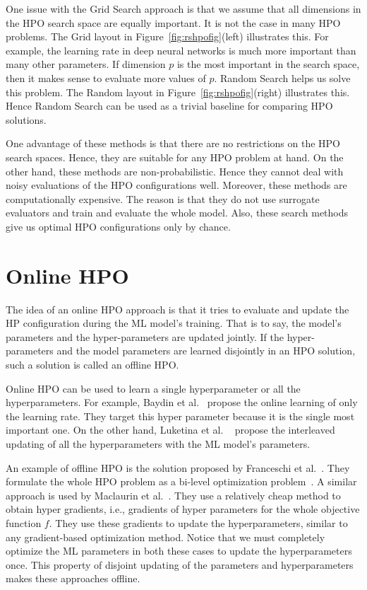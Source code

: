\documentclass[12pt, twoside, ngerman]{report}
\begin{document}
One issue with the Grid Search approach is that we assume that all dimensions in the HPO search space are equally important. It is not the case in many HPO problems. The Grid layout in Figure~\ref{fig:rshpofig}(left) illustrates this. For example, the learning rate in deep neural networks is much more important than many other parameters. If dimension $p$ is the most important in the search space, then it makes sense to evaluate more values of $p$. Random Search helps us solve this problem. 
The Random layout in Figure~\ref{fig:rshpofig}(right) illustrates this. 
Hence Random Search can be used as a trivial baseline for comparing HPO solutions.

One advantage of these methods is that there are no restrictions on the HPO search spaces. Hence, they are suitable for any HPO problem at hand.
On the other hand, these methods are non-probabilistic.
Hence they cannot deal with noisy evaluations of the HPO configurations well.
Moreover, these methods are computationally expensive. The reason is that they do not use surrogate evaluators and train and evaluate the whole model.
Also, these search methods give us optimal HPO configurations only by chance.

\section{Online HPO}
The idea of an online HPO approach is that it tries to evaluate and update the HP configuration during the ML model's training. That is to say, the model's parameters and the hyper-parameters are updated jointly.
If the hyper-parameters and the model parameters are learned disjointly in an HPO solution, such a solution is called an offline HPO.

Online HPO can be used to learn a single hyperparameter or all the hyperparameters. 
For example,  Baydin et al.~\cite{onlineLearningRateUpdate} propose the online learning of only the learning rate. They target this hyper parameter because it is the single most important one. On the other hand, Luketina et al. ~\cite{gradientbasedHPOtuning} propose the interleaved updating of all the hyperparameters with the ML model's parameters.

An example of offline HPO is the solution proposed by Franceschi et al.~\cite{HPOAsBilevelOptimization}. They formulate the whole HPO problem as a bi-level optimization problem~\cite{hutterneuripstutorial}.
A similar approach is used by Maclaurin et al.~\cite{hypergradient}. They use a relatively cheap method to obtain hyper gradients, i.e., gradients of hyper parameters for the whole objective function $f$. They use these gradients to update the hyperparameters, similar to any gradient-based optimization method. Notice that we must completely optimize the ML parameters in both these cases to update the hyperparameters once. This property of disjoint updating of the parameters and hyperparameters makes these approaches offline.
\end{document}
